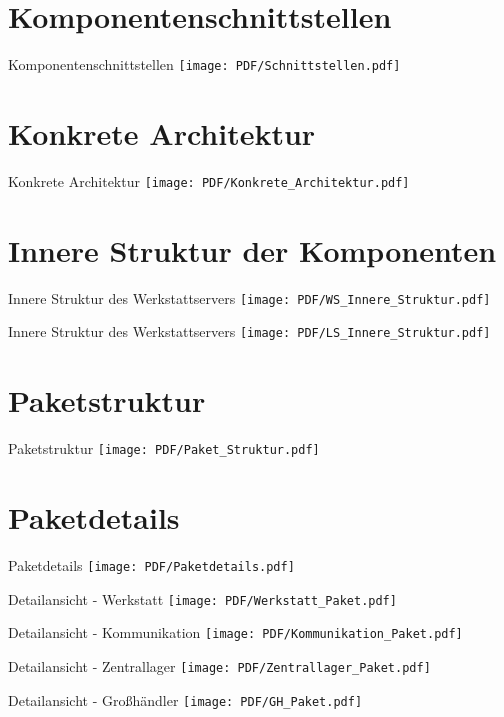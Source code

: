 \documentclass{beamer}
\begin{document}
	\section{Komponentenschnittstellen}
	\begin{frame}{Komponentenschnittstellen}
		\texttt{[image: PDF/Schnittstellen.pdf]}
	\end{frame}
	\section{Konkrete Architektur}
	\begin{frame}{Konkrete Architektur}
		\texttt{[image: PDF/Konkrete\_Architektur.pdf]}
	\end{frame}
	\section{ Innere Struktur der Komponenten}
	\begin{frame}{Innere Struktur des Werkstattservers}
		\texttt{[image: PDF/WS\_Innere\_Struktur.pdf]}
	\end{frame}
	\begin{frame}{Innere Struktur des Werkstattservers}
		\texttt{[image: PDF/LS\_Innere\_Struktur.pdf]}
	\end{frame}
	\section{Paketstruktur}
	\begin{frame}{Paketstruktur}
		\texttt{[image: PDF/Paket\_Struktur.pdf]}
	\end{frame}
	\section{Paketdetails}
	\begin{frame}{Paketdetails}
		\texttt{[image: PDF/Paketdetails.pdf]}
	\end{frame}
\begin{frame}{Detailansicht - Werkstatt}
\texttt{[image: PDF/Werkstatt\_Paket.pdf]}
\end{frame}
\begin{frame}{Detailansicht - Kommunikation}
\texttt{[image: PDF/Kommunikation\_Paket.pdf]}
\end{frame}
\begin{frame}{Detailansicht - Zentrallager}
\texttt{[image: PDF/Zentrallager\_Paket.pdf]}
\end{frame}
\begin{frame}{Detailansicht - Großhändler}
\texttt{[image: PDF/GH\_Paket.pdf]}
\end{frame}
	\begin{frame}[title=Hauptgebaeude_Nacht.jpg]
		\maketitle
		\date{26. Mai 2018}
	\end{frame}
\end{document}
